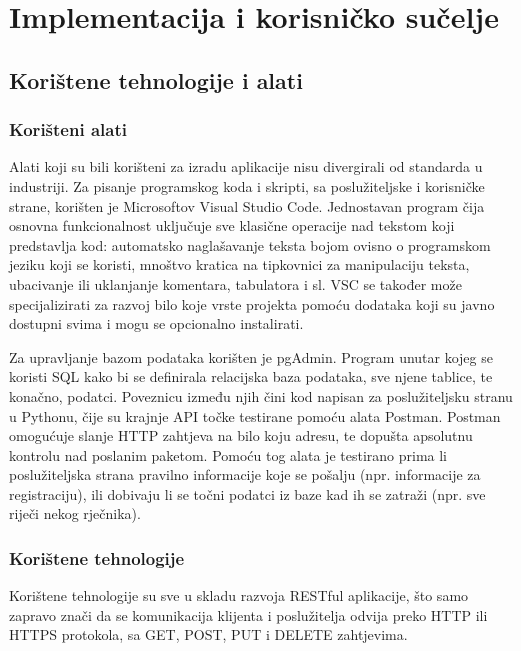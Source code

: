 \chapter{Implementacija i korisničko sučelje}
		
		
		\section{Korištene tehnologije i alati}

             \subsection{Korišteni alati}
                \par    Alati koji su bili korišteni za izradu aplikacije nisu divergirali od standarda u industriji. Za pisanje
                programskog koda i skripti, sa poslužiteljske i korisničke strane, korišten je Microsoftov Visual Studio Code. 
                Jednostavan program čija osnovna funkcionalnost uključuje sve klasične operacije nad tekstom koji predstavlja kod:
                automatsko naglašavanje teksta bojom ovisno o programskom jeziku koji se koristi, mnoštvo kratica 
                na tipkovnici za manipulaciju teksta, ubacivanje ili uklanjanje komentara, tabulatora i sl. VSC se također može 
                specijalizirati za razvoj bilo koje vrste projekta pomoću dodataka koji su javno dostupni svima i mogu se 
                opcionalno instalirati.
                
                \par Za upravljanje bazom podataka korišten je pgAdmin. Program unutar kojeg se koristi SQL kako bi se definirala relacijska baza
                podataka, sve njene tablice, te konačno, podatci. Poveznicu između njih čini kod napisan za poslužiteljsku stranu 
                u Pythonu, čije su krajnje API točke testirane pomoću alata Postman. Postman omogućuje slanje HTTP zahtjeva na 
                bilo koju adresu, te dopušta apsolutnu kontrolu nad poslanim paketom. Pomoću tog alata je testirano prima
                li poslužiteljska strana pravilno informacije koje se pošalju (npr. informacije za registraciju), ili dobivaju li
                se točni podatci iz baze kad ih se zatraži (npr. sve riječi nekog rječnika).

            \subsection{Korištene tehnologije}
                    Korištene tehnologije su sve u skladu razvoja RESTful aplikacije, što samo zapravo znači da se komunikacija
                klijenta i poslužitelja odvija preko HTTP ili HTTPS protokola, sa GET, POST, PUT i DELETE zahtjevima. 
                
